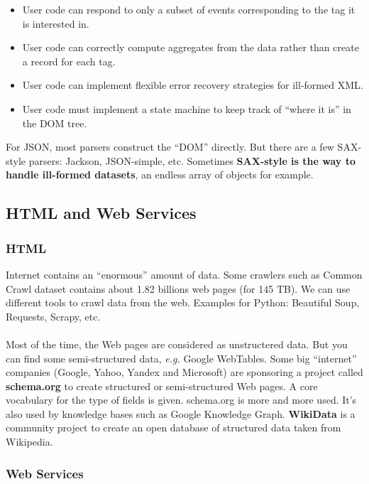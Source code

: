 \documentclass[a4paper,11pt,twoside]{article}
\begin{document}
\begin{itemize}
\renewcommand{\labelitemi}{{\bf +}}
 \item User code can respond to only a subset of events corresponding to the tag it is interested in.
 \item User code can correctly compute aggregates from the data rather than create a record for each tag.
 \item User code can implement flexible error recovery strategies for ill-formed XML.
\renewcommand{\labelitemi}{{\bf --}}
 \item User code must implement a state machine to keep track of ``where it is'' in the DOM tree.
\end{itemize}

For JSON, most parsers construct the ``DOM'' directly. But there are a few SAX-style parsers: Jackson, JSON-simple, etc. Sometimes {\bf SAX-style is the way to handle ill-formed datasets}, an endless array of objects for example.

\subsection{HTML and Web Services}

\subsubsection{HTML}

Internet contains an ``enormous'' amount of data. Some crawlers such as Common Crawl dataset contains about 1.82 billions web pages (for 145 TB). We can use different tools to crawl data from the web. Examples for Python: Beautiful Soup, Requests, Scrapy, etc. 
\\\\
Most of the time, the Web pages are considered as unstructered data. But you can find some semi-structured data, {\it e.g.} Google WebTables. Some big ``internet'' companies (Google, Yahoo, Yandex and Microsoft) are sponsoring a project called {\bf schema.org} to create structured or semi-structured Web pages. A core vocabulary for the type of fields is given. schema.org is more and more used. It's also used by knowledge bases such as Google Knowledge Graph. {\bf WikiData} is a community project to create an open database of structured data taken from Wikipedia.

\subsubsection{Web Services}
\end{document}
